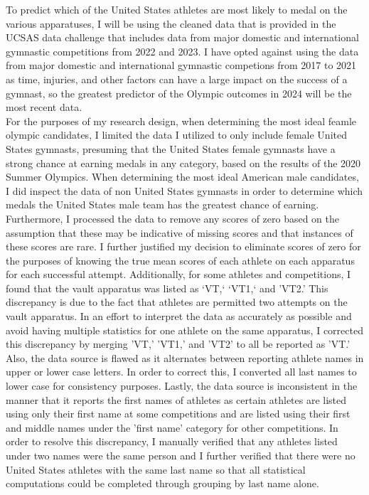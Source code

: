 \documentclass[12pt]{article}
\begin{document}
To predict which of the United States athletes are most likely to medal on the various apparatuses, 
I will be using the cleaned data that 
is provided in the UCSAS data challenge that includes data from major domestic and international 
gymnastic competitions from 2022 and 2023. I have opted against using the data from major domestic
and international gymnastic competions from 2017 to 2021 as time, injuries, 
and other factors can have a large impact on the success of a gymnast, so the greatest predictor
of the Olympic outcomes in 2024 will be the most recent data.
\\
For the purposes of my research design, when determining the most ideal feamle olympic candidates, 
I limited the data I utilized to only include female United States
gymnasts, presuming that the United States female gymnasts have a strong chance at earning medals in any category, 
based on the results of the 2020 Summer Olympics. When determining the most ideal American male candidates, 
I did inspect the data of non United States gymnasts in order to determine which medals the United States 
male team has the greatest chance of earning. 
Furthermore, I processed the data to remove any scores of zero based on the assumption that these may 
be indicative of missing scores and that instances of these scores are rare. I further justified my decision 
to eliminate scores of zero for the purposes of knowing the true mean scores of each athlete on each 
apparatus for each successful attempt. Additionally, for some athletes and competitions, I found that the vault
apparatus was listed as `VT,` `VT1,` and 'VT2.' This discrepancy is due to the fact that athletes are permitted
two attempts on the vault apparatus. In an effort to interpret the data as accurately as possible and avoid having 
multiple statistics for one athlete on the same apparatus, I corrected this discrepancy by merging 'VT,' 'VT1,' and 
'VT2' to all be reported as 'VT.' Also, the data source is flawed as it alternates between reporting athlete names
in upper or lower case letters. In order to correct this, I converted all last names to lower case for consistency 
purposes. Lastly, the data source is inconsistent in the manner that it reports the first names of athletes as certain
athletes are listed using only their first name at some competitions and are listed using their first and middle names 
under the 'first name' category for other competitions. In order to resolve this discrepancy, I manually verified that 
any athletes listed under two names were the same person and I further verified that there were no United States  
athletes with the same last name so that all statistical computations could be completed through grouping by last 
name alone.
\end{document}
